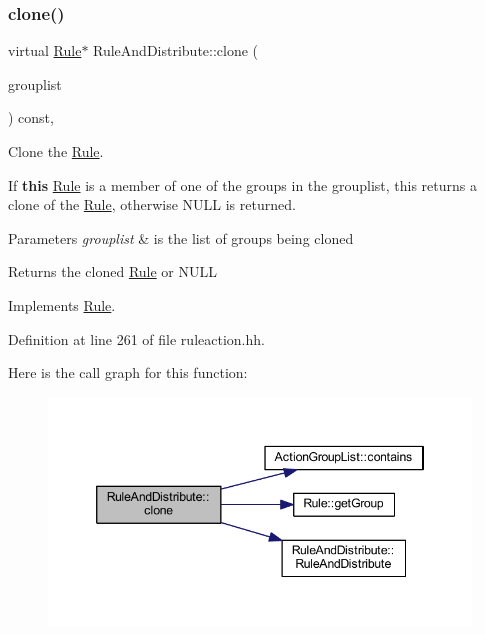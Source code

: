 \subsubsection{\texorpdfstring{clone()}{clone()}}
{\footnotesize\ttfamily virtual \mbox{\hyperlink{class_rule}{Rule}}$\ast$ Rule\+And\+Distribute\+::clone (\begin{DoxyParamCaption}\item[{const \mbox{\hyperlink{class_action_group_list}{Action\+Group\+List}} \&}]{grouplist }\end{DoxyParamCaption}) const\hspace{0.3cm}{\ttfamily [inline]}, {\ttfamily [virtual]}}



Clone the \mbox{\hyperlink{class_rule}{Rule}}. 

If {\bfseries{this}} \mbox{\hyperlink{class_rule}{Rule}} is a member of one of the groups in the grouplist, this returns a clone of the \mbox{\hyperlink{class_rule}{Rule}}, otherwise N\+U\+LL is returned. 
\begin{DoxyParams}{Parameters}
{\em grouplist} & is the list of groups being cloned \\
\hline
\end{DoxyParams}
\begin{DoxyReturn}{Returns}
the cloned \mbox{\hyperlink{class_rule}{Rule}} or N\+U\+LL 
\end{DoxyReturn}


Implements \mbox{\hyperlink{class_rule_a70de90a76461bfa7ea0b575ce3c11e4d}{Rule}}.



Definition at line 261 of file ruleaction.\+hh.

Here is the call graph for this function\+:
\nopagebreak
\begin{figure}[H]
\begin{center}
\leavevmode
\includegraphics[width=346pt]{class_rule_and_distribute_a7c22fc9d5e1f837afb8b13a9cc83ddff_cgraph}
\end{center}
\end{figure}
\mbox{\label{class_rule_and_distribute_a002447d0c756541ef990d881d8244c49}} 
